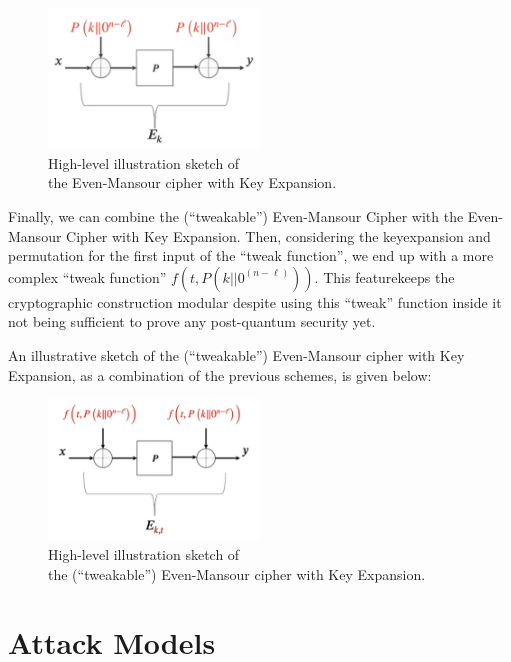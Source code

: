 \documentclass[12pt]{article}
\begin{document}
    \begin{figure}[ht]
        \captionsetup{justification=centering}
        \centering
        \includegraphics[width=0.5\textwidth]{figures/images/img-3.pdf}
        \caption{High-level illustration sketch of\\ the Even-Mansour cipher with Key Expansion.}
    \end{figure}

    \noindent Finally, we can combine the (``tweakable'') Even-Mansour Cipher with the Even-Mansour Cipher with Key Expansion. Then, considering the key\break expansion and permutation for the first input of the ``tweak function'', we end up with a more complex ``tweak function'' $f\left(t, P\left(k||{0}^{(n - \ell)}\right)\right)$. This feature\break keeps the cryptographic construction modular despite using this ``tweak'' function inside it not being sufficient to prove any post-quantum security yet.\break

    \noindent An illustrative sketch of the (``tweakable'') Even-Mansour cipher with Key Expansion, as a combination of the previous schemes, is given below:

    \begin{figure}[ht]
        \captionsetup{justification=centering}
        \centering
        \includegraphics[width=0.5\textwidth]{figures/images/img-4.pdf}
        \caption{High-level illustration sketch of\\ the (``tweakable'') Even-Mansour cipher with Key Expansion.}
    \end{figure}

    
    \section{Attack Models}
    \label{sec:attack-models}
\end{document}

